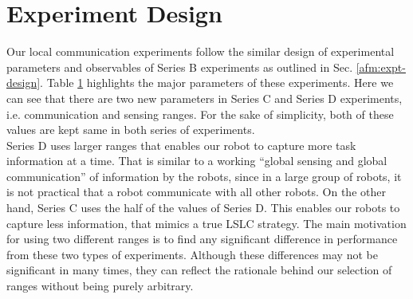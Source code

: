 \section{Experiment Design}
\label{local-comm:expt-design}
%
Our local communication experiments follow the similar design of experimental parameters and observables of Series B experiments as outlined in Sec. \ref{afm:expt-design}. Table \ref{local-comm:expt-design} highlights the major parameters of these experiments. Here we can see that there are two new parameters in Series C and Series D experiments, i.e. communication and sensing ranges. For the sake of simplicity, both of these values are kept same in both series of experiments.\\
Series D uses larger ranges that enables our robot to capture more task information at a time. That is similar to a working ``global sensing and global communication'' of information by the robots, since in a large group of robots, it is not practical that a robot communicate with all other robots. On the other hand, Series C uses the half of the values of Series D. This enables our robots to capture less information, that mimics a true LSLC strategy. The main motivation for using two different ranges is to find any significant difference in performance from these two types of experiments. Although these differences may not be significant in many times, they can reflect the rationale behind our selection of ranges without being purely arbitrary. 
